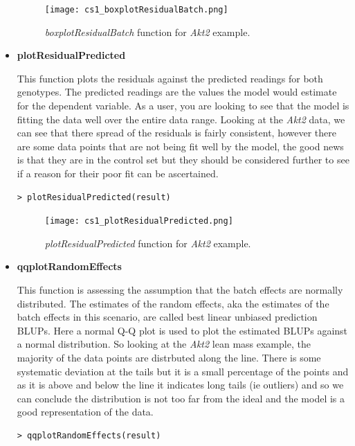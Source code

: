 \documentclass[12pt,a4paper]{article}
\begin{document}
\begin{itemize}
\begin{figure}[H]%
\centerline{\texttt{[image: cs1\_boxplotResidualBatch.png]}}
\caption{\textit{boxplotResidualBatch} function for \textit{Akt2} example.}\label{fig:18}
\end{figure}


\item \textbf{plotResidualPredicted} 

This function plots the residuals against the predicted readings for both genotypes.  The predicted readings are the values the model would estimate for the dependent variable.  
As a user, you are looking to see that the model is fitting the data well over the entire data range. 
Looking at the \textit{Akt2} data, we can see that there spread of the residuals is fairly consistent, 
however there are some data points that are not being fit well by the model, the good news is that they are in the control set but they should be considered further to see if a reason for their poor fit can be ascertained.  

\begingroup
    \fontsize{8pt}{12pt}\selectfont
\begin{verbatim}
> plotResidualPredicted(result)
\end{verbatim}
\endgroup 

\begin{figure}[H]%
\centerline{\texttt{[image: cs1\_plotResidualPredicted.png]}}
\caption{\textit{plotResidualPredicted} function for \textit{Akt2} example.}\label{fig:19}
\end{figure}

\item \textbf{qqplotRandomEffects} 

This function is assessing the assumption that the batch effects are normally distributed. 
The estimates of the random effects, aka the estimates of the batch effects in this scenario, are called best linear unbiased prediction BLUPs. 
Here a normal Q-Q plot is used to plot the estimated BLUPs against a normal distribution. 
So looking at the \textit{Akt2} lean mass example, the majority of the data points are distrbuted along the line. 
There is some systematic deviation at the tails but it is a small percentage of the points and as it is above and below the line it indicates long tails (ie outliers) 
and so we can conclude the distribution is not too far from the ideal and the model is a good representation of the data. 

\begingroup
    \fontsize{8pt}{12pt}\selectfont
\begin{verbatim}
> qqplotRandomEffects(result)
\end{verbatim}
\endgroup 


\end{itemize}
\end{document}
